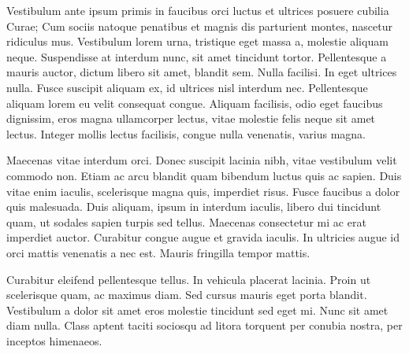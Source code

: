 Vestibulum ante ipsum primis in faucibus orci luctus et ultrices posuere cubilia Curae; Cum sociis natoque penatibus et magnis dis parturient montes, nascetur ridiculus mus. Vestibulum lorem urna, tristique eget massa a, molestie aliquam neque. Suspendisse at interdum nunc, sit amet tincidunt tortor. Pellentesque a mauris auctor, dictum libero sit amet, blandit sem. Nulla facilisi. In eget ultrices nulla. Fusce suscipit aliquam ex, id ultrices nisl interdum nec. Pellentesque aliquam lorem eu velit consequat congue. Aliquam facilisis, odio eget faucibus dignissim, eros magna ullamcorper lectus, vitae molestie felis neque sit amet lectus. Integer mollis lectus facilisis, congue nulla venenatis, varius magna.

Maecenas vitae interdum orci. Donec suscipit lacinia nibh, vitae vestibulum velit commodo non. Etiam ac arcu blandit quam bibendum luctus quis ac sapien. Duis vitae enim iaculis, scelerisque magna quis, imperdiet risus. Fusce faucibus a dolor quis malesuada. Duis aliquam, ipsum in interdum iaculis, libero dui tincidunt quam, ut sodales sapien turpis sed tellus. Maecenas consectetur mi ac erat imperdiet auctor. Curabitur congue augue et gravida iaculis. In ultricies augue id orci mattis venenatis a nec est. Mauris fringilla tempor mattis.

Curabitur eleifend pellentesque tellus. In vehicula placerat lacinia. Proin ut scelerisque quam, ac maximus diam. Sed cursus mauris eget porta blandit. Vestibulum a dolor sit amet eros molestie tincidunt sed eget mi. Nunc sit amet diam nulla. Class aptent taciti sociosqu ad litora torquent per conubia nostra, per inceptos himenaeos. 